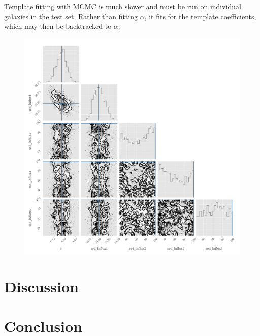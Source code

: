 \documentclass[12pt, preprint]{aastex}
\begin{document}
Template fitting with MCMC is much slower and must be run on individual galaxies in the test set.  Rather than fitting $\alpha$, it fits for the template coefficients, which may then be backtracked to $\alpha$.

\begin{figure}
\includegraphics[width=1.\textwidth]{../fig/sed_model_galsim_corner.png}
\caption{}
\label{fig:temp}
\end{figure}

\section{Discussion}

\section{Conclusion}
\end{document}
